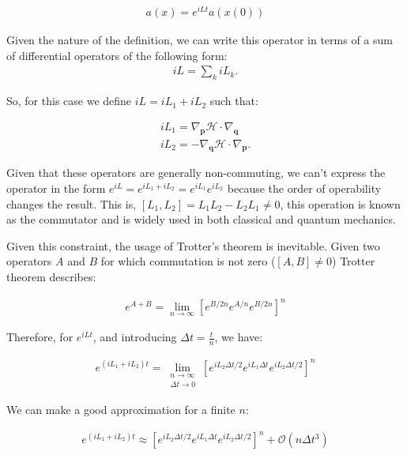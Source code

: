 \documentclass[draft]{agujournal2019}
\begin{document}
\begin{definition}
\begin{align*}
    a(x) = e^{iLt}a(x(0))
\end{align*}

Given the nature of the definition, we can write this operator in terms of a sum of differential operators of the following form:
\begin{align*}
    iL = \sum_k iL_k
.\end{align*}

So, for this case we define $iL = iL_1 + iL_2$ such that:

\begin{align*}
    iL_1 = \nabla_{\mathbf{p}} \mathcal{H} \cdot \nabla_{\mathbf{q}} \\
    iL_2 = - \nabla_{\mathbf{q}} \mathcal{H} \cdot \nabla_{\mathbf{p}}
.\end{align*}

Given that these operators are generally non-commuting, we can't express the operator in the form $e^{iL} = e^{iL_1 + iL_2} = e^{iL_1}e^{iL_2}$ because the order of operability changes the result. This is, $\left[ L_1, L_2\right] = L_1L_2 - L_2L_1 \neq 0$, this operation is known as the commutator and is widely used in both classical and quantum mechanics.

Given this constraint, the usage of Trotter's theorem is inevitable. Given two operators $A$ and $B$ for which commutation is not zero ($\left[ A, B \right] \neq 0$) Trotter theorem describes:

\begin{align*}
    e^{A + B} = \lim_{n \to \infty} \left[ e^{B / 2n} e^{A / n} e^{B / 2n} \right]^n
\end{align*}

Therefore, for $e^{iLt}$, and introducing $\Delta t = \frac{t}{n}$, we have:

\begin{align*}
    e^{(iL_1 + iL_2) t} = \lim_{\substack{n \to \infty \\ \Delta t \to 0}} \left[ e^{iL_2 \Delta t / 2} e^{iL_1 \Delta t} e^{iL_2 \Delta t / 2} \right]^n
\end{align*}

We can make a good approximation for a finite $n$:

\begin{align*}
    e^{(iL_1 + iL_2) t} \approx \left[ e^{iL_2 \Delta t / 2} e^{iL_1 \Delta t} e^{iL_2 \Delta t / 2} \right]^n + \mathcal{O}(n \Delta t^3)
\end{align*}


\end{definition}
\end{document}
